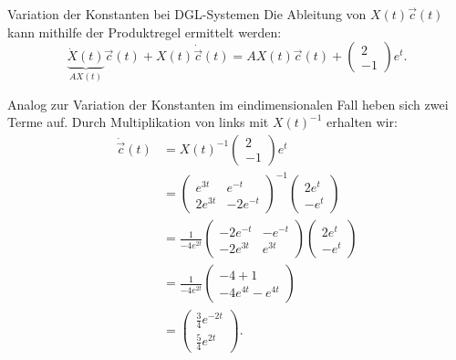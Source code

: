 \begin{bsp}{Variation der Konstanten bei DGL-Systemen}{}
    Die Ableitung von \(X(t)\vec{c}(t)\) kann mithilfe
    der Produktregel ermittelt werden:
    \[
        \underbrace{\dot{X}(t)}_{AX(t)}\vec{c}(t)
        +
        X(t)\dot{\vec{c}}(t)
        =
        AX(t)\vec{c}(t)
        +
        \begin{pmatrix}2\\-1\end{pmatrix}e^t.
    \]

    Analog zur Variation der Konstanten im eindimensionalen Fall
    heben sich zwei Terme auf. Durch Multiplikation von links
    mit \(X(t)^{-1}\) erhalten wir:
    \[
        \begin{aligned}
            \dot{\vec{c}}(t)
             & =
            X(t)^{-1}
            \begin{pmatrix}2\\-1\end{pmatrix}e^t \\[2mm]
             & =
            \begin{pmatrix}
                e^{3t}  & e^{-t}   \\
                2e^{3t} & -2e^{-t}
            \end{pmatrix}^{-1}
            \begin{pmatrix}
                2e^t \\-e^t
            \end{pmatrix}                   \\[2mm]
             & =
            \frac{1}{-4e^{2t}}
            \begin{pmatrix}
                -2e^{-t} & -e^{-t} \\
                -2e^{3t} & e^{3t}
            \end{pmatrix}
            \begin{pmatrix}
                2e^t \\-e^t
            \end{pmatrix}                   \\[2mm]
             & =
            \frac{1}{-4e^{2t}}
            \begin{pmatrix}
                -4+1 \\
                -4e^{4t}-e^{4t}
            \end{pmatrix}                   \\[2mm]
             & =
            \begin{pmatrix}
                \frac34 e^{-2t} \\[1mm]
                \frac54 e^{2t}
            \end{pmatrix}.
        \end{aligned}
    \]


\end{bsp}
